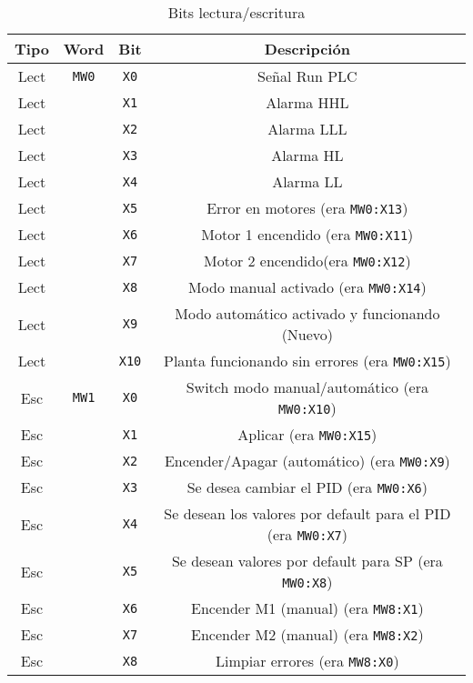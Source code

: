 \begin{table}[!t]

\renewcommand{\arraystretch}{1.3}
\centering
\begin{tabular}{c||c||c||c}
\hline
\bfseries Tipo & \bfseries Word & \bfseries Bit & \bfseries Descripción\\
\hline \hline
Lect & \verb|MW0| & \verb|X0| & Señal Run PLC\\
Lect & & \verb|X1| & Alarma HHL\\
Lect & & \verb|X2|& Alarma LLL\\
Lect & & \verb|X3|& Alarma HL\\
Lect & & \verb|X4|& Alarma LL\\
Lect & & \verb|X5|& Error en motores (era \verb|MW0:X13|)\\
Lect & & \verb|X6|& Motor 1 encendido (era \verb|MW0:X11|)\\
Lect & & \verb|X7|& Motor 2 encendido(era \verb|MW0:X12|)\\
Lect & & \verb|X8|& Modo manual activado (era \verb|MW0:X14|)\\
Lect & & \verb|X9|& Modo automático activado y funcionando (Nuevo)\\
Lect & & \verb|X10|& Planta funcionando sin errores (era \verb|MW0:X15|)\\
\hline
Esc & \verb|MW1| & \verb|X0|& Switch modo manual/automático (era 
\verb|MW0:X10|)\\
Esc & & \verb|X1|& Aplicar (era \verb|MW0:X15|)\\
Esc & & \verb|X2|& Encender/Apagar (automático) (era \verb|MW0:X9|)\\
Esc & & \verb|X3|& Se desea cambiar el PID (era \verb|MW0:X6|)\\
Esc & & \verb|X4|& Se desean los valores por default para el PID (era 
\verb|MW0:X7|)\\
Esc & & \verb|X5|& Se desean valores por default para SP (era \verb|MW0:X8|)\\
Esc & & \verb|X6|& Encender M1 (manual) (era \verb|MW8:X1|)\\
Esc & & \verb|X7|& Encender M2 (manual) (era \verb|MW8:X2|)\\
Esc & & \verb|X8|& Limpiar errores (era \verb|MW8:X0|)\\
\hline

\hline
\end{tabular}
\caption{Bits lectura/escritura}
\end{table}

